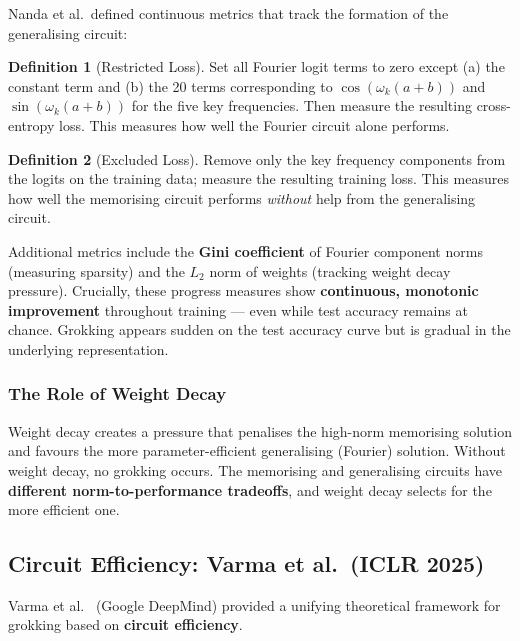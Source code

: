 \documentclass[11pt, a4paper]{article}
\theoremstyle{definition}
\newtheorem{definition}{Definition}[section]
\theoremstyle{plain}
\begin{document}
Nanda et al.\ defined continuous metrics that track the formation of the generalising circuit:

\begin{definition}[Restricted Loss]
Set all Fourier logit terms to zero except (a) the constant term and (b) the 20 terms corresponding to $\cos(\omega_k(a{+}b))$ and $\sin(\omega_k(a{+}b))$ for the five key frequencies. Then measure the resulting cross-entropy loss. This measures how well the Fourier circuit alone performs.
\end{definition}

\begin{definition}[Excluded Loss]
Remove only the key frequency components from the logits on the training data; measure the resulting training loss. This measures how well the memorising circuit performs \emph{without} help from the generalising circuit.
\end{definition}

Additional metrics include the \textbf{Gini coefficient} of Fourier component norms (measuring sparsity) and the $L_2$ norm of weights (tracking weight decay pressure). Crucially, these progress measures show \textbf{continuous, monotonic improvement} throughout training --- even while test accuracy remains at chance. Grokking appears sudden on the test accuracy curve but is gradual in the underlying representation.

\subsubsection{The Role of Weight Decay}

Weight decay creates a pressure that penalises the high-norm memorising solution and favours the more parameter-efficient generalising (Fourier) solution. Without weight decay, no grokking occurs. The memorising and generalising circuits have \textbf{different norm-to-performance tradeoffs}, and weight decay selects for the more efficient one.

\subsection{Circuit Efficiency: Varma et al.\ (ICLR 2025)}
\label{subsec:varma}

Varma et al.~\cite{varma2025grokking} (Google DeepMind) provided a unifying theoretical framework for grokking based on \textbf{circuit efficiency}.
\end{document}
